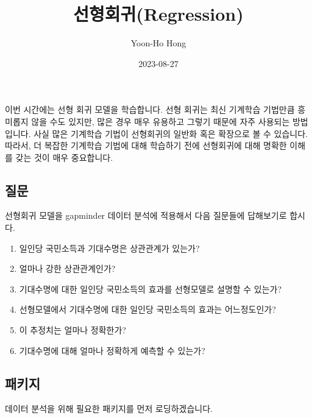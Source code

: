 \documentclass[
  letterpaper,
  DIV=11,
  numbers=noendperiod]{scrartcl}
\title{선형회귀(Regression)}
\author{Yoon-Ho Hong}
\date{2023-08-27}
\providecommand{\tightlist}{%
  \setlength{\itemsep}{0pt}\setlength{\parskip}{0pt}}\usepackage{longtable,booktabs,array}
\renewcommand*\contentsname{Table of contents}
\newcommand\contentsname{Table of contents}
\begin{document}
\maketitle
\ifdefined\Shaded\renewenvironment{Shaded}{\begin{tcolorbox}[enhanced, boxrule=0pt, interior hidden, borderline west={3pt}{0pt}{shadecolor}, sharp corners, breakable, frame hidden]}{\end{tcolorbox}}\fi

\renewcommand*\contentsname{Table of contents}
{
\hypersetup{linkcolor=}
\setcounter{tocdepth}{3}
\tableofcontents
}
이번 시간에는 선형 회귀 모델을 학습합니다. 선형 회귀는 최신 기계학습
기법만큼 흥미롭지 않을 수도 있지만, 많은 경우 매우 유용하고 그렇기
때문에 자주 사용되는 방법입니다. 사실 많은 기계학습 기법이 선형회귀의
일반화 혹은 확장으로 볼 수 있습니다. 따라서, 더 복잡한 기계학습 기법에
대해 학습하기 전에 선형회귀에 대해 명확한 이해를 갖는 것이 매우
중요합니다.

\hypertarget{uxc9c8uxbb38}{%
\subsection{질문}\label{uxc9c8uxbb38}}

선형회귀 모델을 gapminder 데이터 분석에 적용해서 다음 질문들에
답해보기로 합시다.

\begin{enumerate}
\def\labelenumi{\arabic{enumi}.}
\tightlist
\item
  일인당 국민소득과 기대수명은 상관관계가 있는가?
\item
  얼마나 강한 상관관계인가?\\
\item
  기대수명에 대한 일인당 국민소득의 효과를 선형모델로 설명할 수 있는가?
\item
  선형모델에서 기대수명에 대한 일인당 국민소득의 효과는 어느정도인가?\\
\item
  이 추정치는 얼마나 정확한가?\\
\item
  기대수명에 대해 얼마나 정확하게 예측할 수 있는가?
\end{enumerate}

\hypertarget{uxd328uxd0a4uxc9c0}{%
\subsection{패키지}\label{uxd328uxd0a4uxc9c0}}

데이터 분석을 위해 필요한 패키지를 먼저 로딩하겠습니다.
\end{document}
